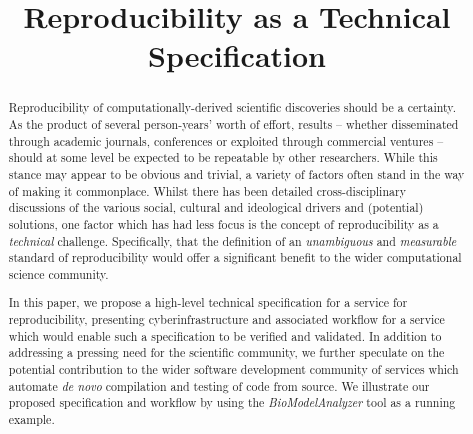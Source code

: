 \documentclass[conference]{IEEEtran}
\begin{document}
%
\title{Reproducibility as a Technical Specification}


\author{
\and
{}
\and
{}
}





\maketitle


\begin{abstract}
Reproducibility of computationally-derived scientific discoveries
should be a certainty. As the product of several person-years' worth
of effort, results -- whether disseminated through academic journals,
conferences or exploited through commercial ventures -- should at some
level be expected to be repeatable by other researchers. While this
stance may appear to be obvious and trivial, a variety of factors
often stand in the way of making it commonplace. Whilst there has been
detailed cross-disciplinary discussions of the various social,
cultural and ideological drivers and (potential) solutions, one factor
which has had less focus is the concept of reproducibility as a
\emph{technical} challenge. Specifically, that the definition of an
\emph{unambiguous} and \emph{measurable} standard of reproducibility
would offer a significant benefit to the wider computational science
community.

In this paper, we propose a high-level technical specification for a
service for reproducibility, presenting cyberinfrastructure and
associated workflow for a service which would enable such a
specification to be verified and validated. In addition to addressing
a pressing need for the scientific community, we further speculate on
the potential contribution to the wider software development community
of services which automate \emph{de novo} compilation and testing of
code from source. We illustrate our proposed specification and
workflow by using the {\emph{BioModelAnalyzer}} tool as a running
example.
\end{abstract}
\end{document}
